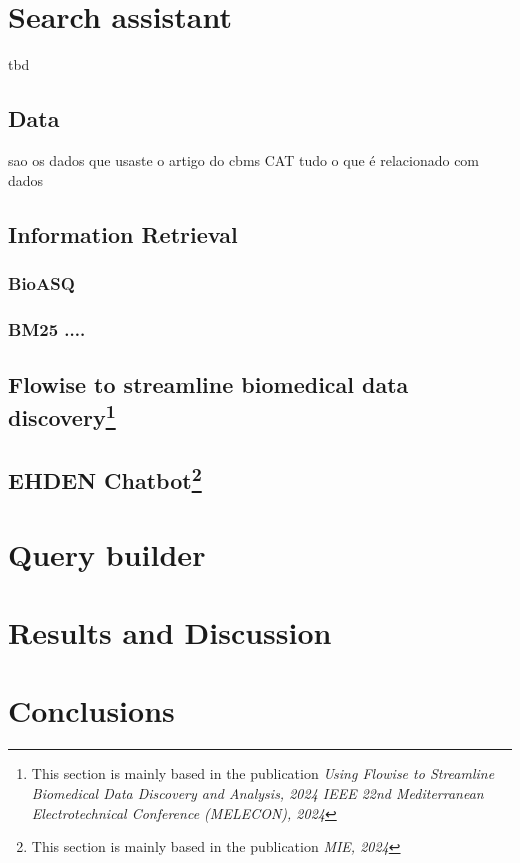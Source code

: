 \chapter{Search assistant}
tbd

\section{Data}
sao os dados que usaste
o artigo do cbms CAT
tudo o que é relacionado com dados


\section{Information Retrieval}

\subsection{BioASQ}

\subsection{BM25 ....}


\section{Flowise to streamline biomedical data discovery\footnote{This section is mainly based in the publication \textit{Using Flowise to Streamline Biomedical Data Discovery and Analysis, 2024 IEEE 22nd Mediterranean Electrotechnical Conference (MELECON), 2024}}}


\section{EHDEN Chatbot\footnote{This section is mainly based in the publication \textit{MIE, 2024}}}



\chapter{Query builder}


\chapter{Results and Discussion}


\chapter{Conclusions}